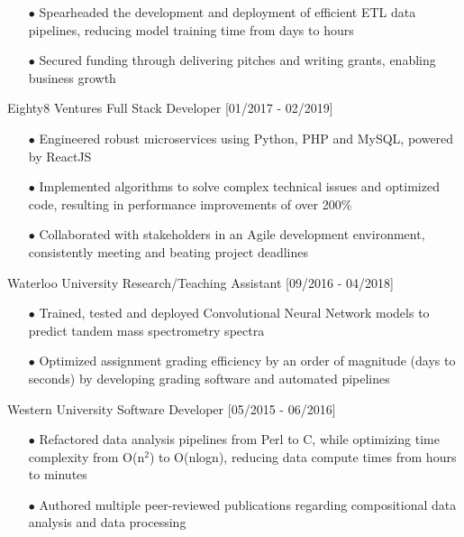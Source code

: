 \documentclass[]{twentysecondcv}
\begin{document}
\begin{twenty}
{\begin{itemize}
        \item[$\bullet$] Spearheaded the development and deployment of efficient ETL data pipelines, reducing model training time from days to hours
        \item[$\bullet$] Secured funding through delivering pitches and writing grants, enabling business growth
    \end{itemize}
    }
  \twentyitem
    {Eighty8 Ventures}
    {Full Stack Developer}
    {[01/2017 - 02/2019]}
    {
    \begin{itemize}
        \item[$\bullet$] Engineered robust microservices using Python, PHP and MySQL, powered by ReactJS
        \item[$\bullet$] Implemented algorithms to solve complex technical issues and optimized code, resulting in performance improvements of over 200\%
        \item[$\bullet$] Collaborated with stakeholders in an Agile development environment, consistently meeting and beating project deadlines
    \end{itemize}
    }
  \twentyitem
    {Waterloo University}
    {Research/Teaching Assistant}
    {[09/2016 - 04/2018]}
    {
    \begin{itemize}
        \item[$\bullet$] Trained, tested and deployed Convolutional Neural Network models to predict tandem mass spectrometry spectra 
        \item[$\bullet$] Optimized assignment grading efficiency by an order of magnitude (days to seconds) by developing grading software and automated pipelines
    \end{itemize}
    }
  \twentyitem
    {Western University}
    {Software Developer}
    {[05/2015 - 06/2016]}
    {
    \begin{itemize}
        \item[$\bullet$] Refactored data analysis pipelines from Perl to C, while optimizing time complexity from O(n$^2$) to O(nlogn), reducing data compute times from hours to minutes
        \item[$\bullet$] Authored multiple peer-reviewed publications regarding compositional data analysis and data processing
    \end{itemize}
}

\end{twenty}
\end{document}
